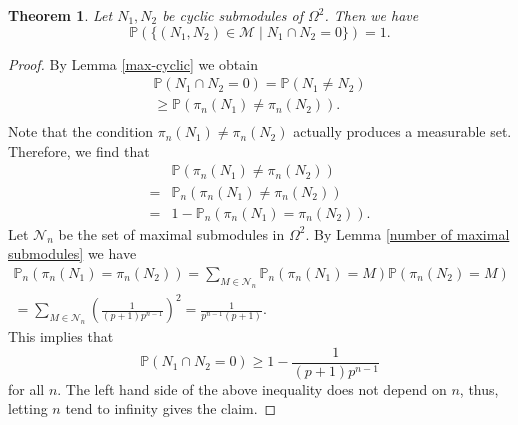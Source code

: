 \documentclass[10pt,a4paper]{amsart}
\newtheorem{theorem}{Theorem}
\newcommand{\Prob}{\mathbb{P}}
\begin{document}
\begin{theorem}
\label{thm:probability}
    Let $N_1,N_2$ be cyclic submodules of $\Omega^2$. Then we have
    \[\Prob(\{(N_1, N_2)\in \mathcal{M}\mid N_1\cap N_2=0\})=1.\]
\end{theorem}

\begin{proof}
By Lemma \ref{max-cyclic} we obtain 
    \begin{align*}
        \Prob(N_1\cap N_2=0)=\Prob(N_1\neq N_2)\\
        \ge \Prob(\pi_{n}(N_1)\neq \pi_n(N_2)).\\
    \end{align*}
    Note that the condition $\pi_n(N_1)\neq \pi_n(N_2)$ actually produces a measurable set. Therefore, we find that 
    \[\begin{split} & \Prob(\pi_{n}(N_1)\neq \pi_n(N_2)) \\
    = & \Prob_n(\pi_{n}(N_1)\neq \pi_n(N_2)) \\
    = &1-\Prob_n(\pi_{n}(N_1)= \pi_n(N_2)).\end{split}\]
    Let $\mathcal{N}_n$ be the set of maximal submodules in $\Omega^2$. 
     By Lemma \ref{number of maximal submodules} we have
    \begin{align*}\Prob_n(\pi_{n}(N_1)=\pi_n(N_2))=\sum_{M\in \mathcal{N}_n}\Prob_n(\pi_n(N_1)=M)\Prob(\pi_n(N_2)=M)\\=\sum_{M\in \mathcal{N}_n}\left(\frac{1}{(p+1)p^{n-1}}\right)^2=\frac{1}{p^{n-1}(p+1)} .\end{align*}
    This implies that 
    \[\Prob(N_1\cap N_2=0)\ge 1-\frac{1}{(p+1)p^{n-1}}\]
    for all $n$. The left hand side of the above inequality does not depend on $n$, thus, letting $n$ tend to infinity gives the claim.

\end{proof}
\end{document}
